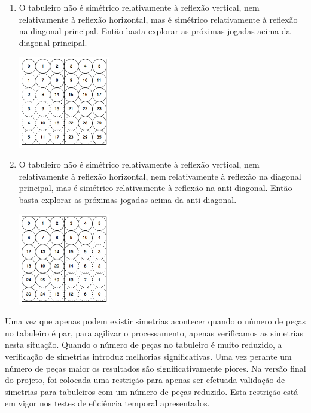 \begin{enumerate}
\begin{enumerate}
\begin{table}[H]
\end{table}			
			\item O tabuleiro não é simétrico relativamente à reflexão vertical, nem relativamente à reflexão horizontal, mas é simétrico relativamente à reflexão na diagonal principal. Então basta explorar as próximas jogadas acima da diagonal principal.
\begin{table}[H]
\centering
\includegraphics[height=4cm]{images/p_dp.png}
\end{table}			
			\item O tabuleiro não é simétrico relativamente à reflexão vertical, nem relativamente à reflexão horizontal, nem relativamente à reflexão na diagonal principal, mas é simétrico relativamente à reflexão na anti diagonal. Então basta explorar as próximas jogadas acima da anti diagonal.
\begin{table}[H]
\centering
\includegraphics[height=4cm]{images/p_ad.png}
\end{table}			
		\end{enumerate}
\end{enumerate}

Uma vez que apenas podem existir simetrias acontecer quando o número de peças no tabuleiro é par, para agilizar o processamento, apenas verificamos as simetrias nesta situação. Quando o número de peças no tabuleiro é muito reduzido, a verificação de simetrias introduz melhorias significativas. Uma vez perante um número de peças maior os resultados são significativamente piores. Na versão final do projeto, foi colocada uma restrição para apenas ser efetuada validação de simetrias para tabuleiros com um número de peças reduzido. Esta restrição está em vigor nos testes de eficiência temporal apresentados.

